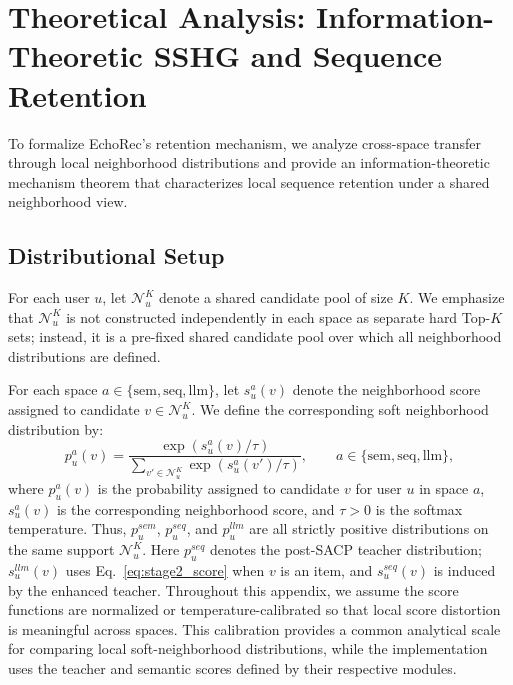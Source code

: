 ﻿\documentclass{article}
\begin{document}
\section{Theoretical Analysis: Information-Theoretic SSHG and Sequence Retention}
\label{app:theory}

To formalize EchoRec's retention mechanism, we analyze cross-space transfer through local neighborhood distributions and provide an information-theoretic mechanism theorem that characterizes local sequence retention under a shared neighborhood view.

\subsection{Distributional Setup}
\label{app:theory_setup}

For each user $u$, let $\mathcal{N}_u^K$ denote a shared candidate pool of size $K$. We emphasize that $\mathcal{N}_u^K$ is not constructed independently in each space as separate hard Top-$K$ sets; instead, it is a pre-fixed shared candidate pool over which all neighborhood distributions are defined.

For each space $a \in \{\mathrm{sem}, \mathrm{seq}, \mathrm{llm}\}$, let $s_u^a(v)$ denote the neighborhood score assigned to candidate $v \in \mathcal{N}_u^K$. We define the corresponding soft neighborhood distribution by:
\begin{equation}
p_u^a(v)
=
\frac{\exp(s_u^a(v)/\tau)}
{\sum_{v' \in \mathcal{N}_u^K}\exp(s_u^a(v')/\tau)},
\qquad
a \in \{\mathrm{sem}, \mathrm{seq}, \mathrm{llm}\},
\label{eq:soft_dist}
\end{equation}
where $p_u^a(v)$ is the probability assigned to candidate $v$ for user $u$ in space $a$, $s_u^a(v)$ is the corresponding neighborhood score, and $\tau>0$ is the softmax temperature. Thus, $p_u^{sem}$, $p_u^{seq}$, and $p_u^{llm}$ are all strictly positive distributions on the same support $\mathcal{N}_u^K$.
Here $p_u^{seq}$ denotes the post-SACP teacher distribution; $s_u^{llm}(v)$ uses Eq.~\eqref{eq:stage2_score} when $v$ is an item, and $s_u^{seq}(v)$ is induced by the enhanced teacher.
Throughout this appendix, we assume the score functions are normalized or temperature-calibrated so that local score distortion is meaningful across spaces.
This calibration provides a common analytical scale for comparing local soft-neighborhood distributions, while the implementation uses the teacher and semantic scores defined by their respective modules.
\end{document}
